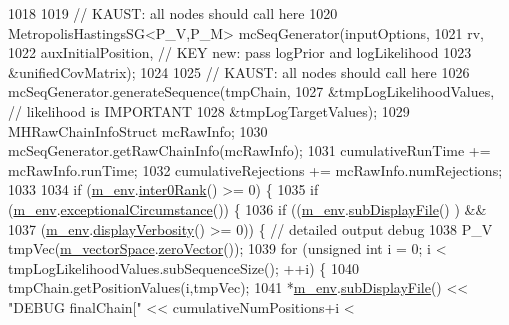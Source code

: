 \begin{DoxyCode}
1018 
1019     \textcolor{comment}{// KAUST: all nodes should call here}
1020     MetropolisHastingsSG<P\_V,P\_M> mcSeqGenerator(inputOptions,
1021                                                         rv,
1022                                                         auxInitialPosition, \textcolor{comment}{// KEY new: pass logPrior and
       logLikelihood}
1023                                                         &unifiedCovMatrix);
1024 
1025     \textcolor{comment}{// KAUST: all nodes should call here}
1026     mcSeqGenerator.generateSequence(tmpChain,
1027                                     &tmpLogLikelihoodValues, \textcolor{comment}{// likelihood is IMPORTANT}
1028                                     &tmpLogTargetValues);
1029     MHRawChainInfoStruct mcRawInfo;
1030     mcSeqGenerator.getRawChainInfo(mcRawInfo);
1031     cumulativeRunTime    += mcRawInfo.runTime;
1032     cumulativeRejections += mcRawInfo.numRejections;
1033 
1034     \textcolor{keywordflow}{if} (\hyperlink{class_q_u_e_s_o_1_1_m_l_sampling_a13f1ca4fe9f94822fe572a743eaced1d}{m\_env}.\hyperlink{class_q_u_e_s_o_1_1_base_environment_ae106b5bb8a80b655b88b3a26b1e7c185}{inter0Rank}() >= 0) \{
1035       \textcolor{keywordflow}{if} (\hyperlink{class_q_u_e_s_o_1_1_m_l_sampling_a13f1ca4fe9f94822fe572a743eaced1d}{m\_env}.\hyperlink{class_q_u_e_s_o_1_1_base_environment_af0bc451b18302cfd5ee747c321e1c6e5}{exceptionalCircumstance}()) \{
1036         \textcolor{keywordflow}{if} ((\hyperlink{class_q_u_e_s_o_1_1_m_l_sampling_a13f1ca4fe9f94822fe572a743eaced1d}{m\_env}.\hyperlink{class_q_u_e_s_o_1_1_base_environment_a8a0064746ae8dddfece4229b9ad374d6}{subDisplayFile}()       ) &&
1037             (\hyperlink{class_q_u_e_s_o_1_1_m_l_sampling_a13f1ca4fe9f94822fe572a743eaced1d}{m\_env}.\hyperlink{class_q_u_e_s_o_1_1_base_environment_a1fe5f244fc0316a0ab3e37463f108b96}{displayVerbosity}() >= 0)) \{ \textcolor{comment}{// detailed output debug}
1038           P\_V tmpVec(\hyperlink{class_q_u_e_s_o_1_1_m_l_sampling_a7bc4c72f65ba9166ed94a6e198b0915b}{m\_vectorSpace}.\hyperlink{class_q_u_e_s_o_1_1_vector_space_a92e963bb5cab3eecd290dfe4b8f03b04}{zeroVector}());
1039           \textcolor{keywordflow}{for} (\textcolor{keywordtype}{unsigned} \textcolor{keywordtype}{int} i = 0; i < tmpLogLikelihoodValues.subSequenceSize(); ++i) \{
1040             tmpChain.getPositionValues(i,tmpVec);
1041             *\hyperlink{class_q_u_e_s_o_1_1_m_l_sampling_a13f1ca4fe9f94822fe572a743eaced1d}{m\_env}.\hyperlink{class_q_u_e_s_o_1_1_base_environment_a8a0064746ae8dddfece4229b9ad374d6}{subDisplayFile}() << \textcolor{stringliteral}{"DEBUG finalChain["} << cumulativeNumPositions+i <

\end{DoxyCode}
